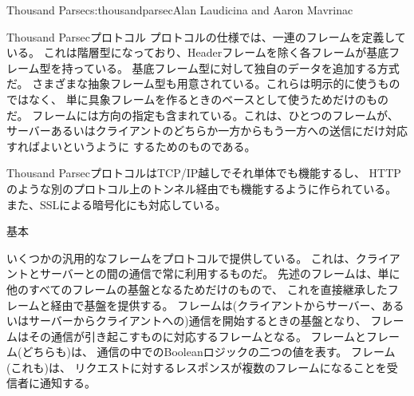 \begin{aosachapter}{Thousand Parsec}{s:thousandparsec}{Alan Laudicina and Aaron Mavrinac}
\begin{aosasect1}{Thousand Parsecプロトコル}
プロトコルの仕様では、一連のフレームを定義している。
これは階層型になっており、Headerフレームを除く各フレームが基底フレーム型を持っている。
基底フレーム型に対して独自のデータを追加する方式だ。
さまざまな抽象フレーム型も用意されている。これらは明示的に使うものではなく、
単に具象フレームを作るときのベースとして使うためだけのものだ。
フレームには方向の指定も含まれている。これは、ひとつのフレームが、
サーバーあるいはクライアントのどちらか一方からもう一方への送信にだけ対応すればよいというように
するためのものである。

Thousand ParsecプロトコルはTCP/IP越しでそれ単体でも機能するし、
HTTPのような別のプロトコル上のトンネル経由でも機能するように作られている。
また、SSLによる暗号化にも対応している。

\begin{aosasect2}{基本}

いくつかの汎用的なフレームをプロトコルで提供している。
これは、クライアントとサーバーとの間の通信で常に利用するものだ。
先述のフレームは、単に他のすべてのフレームの基盤となるためだけのもので、
これを直接継承したフレームと経由で基盤を提供する。
フレームは(クライアントからサーバー、あるいはサーバーからクライアントへの)通信を開始するときの基盤となり、
フレームはその通信が引き起こすものに対応するフレームとなる。
フレームとフレーム(どちらも)は、
通信の中でのBooleanロジックの二つの値を表す。
フレーム(これも)は、
リクエストに対するレスポンスが複数のフレームになることを受信者に通知する。


\end{aosasect2}
\end{aosasect1}
\end{aosachapter}
